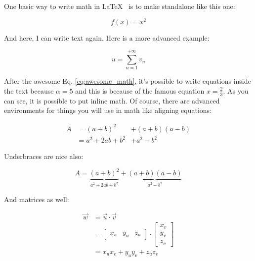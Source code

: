 \documentclass[10pt,a4paper,twoside]{article}
\begin{document}
One basic way to write math in \LaTeX~ is to make standalone like this one:

$$
  f(x) = x^2
$$

\noindent And here, I can write text again.
Here is a more advanced example:

\begin{equation}
  u = \sum_{n=1}^{+\infty} v_n
  \label{eq:awesome_math}
\end{equation}

\noindent After the awesome Eq. \ref{eq:awesome_math}, it's possible to write equations inside the text because $\alpha = 5$ and this is because of the famous equation $x = \frac{2}{3}$.
As you can see, it is possible to put inline math.
Of course, there are advanced environments for things you will use in math like aligning equations:

\begin{align}
  A & = (a+b)^2        & + (a+b)(a-b)\nonumber \\
    & = a^2 + 2ab +b^2 & + a^2 - b^2
\end{align}

\noindent Underbraces are nice also:

\begin{equation}
  A = \underbrace{(a+b)^2}_{a^2 + 2ab +b^2}
  + \underbrace{(a+b)(a-b)}_{a^2 - b^2}
\end{equation}

\nonumber And matrices as well:

\begin{align}
  \vec w & = \vec u \cdot \vec v         \\
         & =
  \begin{bmatrix}
    x_u & y_u & z_u
  \end{bmatrix}
  \cdot
  \begin{bmatrix}
    x_v \\ y_v \\ z_v
  \end{bmatrix}              \\
         & = x_u x_v + y_u y_v + z_u z_v
\end{align}
\end{document}
